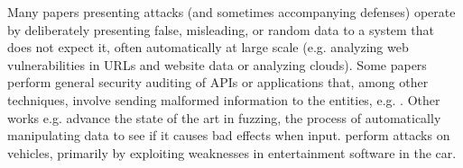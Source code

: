 Many papers presenting attacks (and sometimes accompanying defenses) operate by deliberately presenting false, misleading, or random data to a system that does not expect it, often automatically at large scale (e.g. \cite{khodayariGreatRequestRobbery2024,wangBreakWallBottom2024,kleinParseMeBaby2024,wangWhereURLsBecome2024} analyzing web vulnerabilities in URLs and website data or  analyzing clouds).
Some papers perform general security auditing of APIs or applications that, among other techniques, involve sending malformed information to the entities, e.g. \cite{duVulnerabilityorientedTestingRESTful,aliRiseInspectronAutomated}.
Other works e.g. \cite{zhangPredecessorawareDirectedGreybox2024,liuAFGenWholeFunctionFuzzing2024,liuLabradorResponseGuided2024,chenChronosFindingTimeout2024,wangSyzTrustStateawareFuzzing2024,xuSaturnHostGadgetSynergistic2024,yangGenericDatabaseManagement,liSDFuzzTargetStates,xiangCriticalCodeGuided,rongUnbiasedMultipleTargetFuzzing,gulerAtroposEffectiveFuzzing2024} advance the state of the art in fuzzing, the process of automatically manipulating data to see if it causes bad effects when input.
\cite{jingRevisitingAutomotiveAttack2024} perform attacks on vehicles, primarily by exploiting weaknesses in entertainment software in the car.


